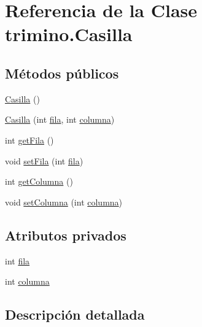 \hypertarget{classtrimino_1_1Casilla}{}\section{Referencia de la Clase trimino.\+Casilla}
\label{classtrimino_1_1Casilla}
\subsection*{Métodos públicos}
\begin{DoxyCompactItemize}
\item 
\mbox{\hyperlink{classtrimino_1_1Casilla_a80d69d5853cf1aa0e0fa5bf7fe1713b3}{Casilla}} ()
\item 
\mbox{\hyperlink{classtrimino_1_1Casilla_a0bfd77fe7a03076a4651f411dd2f8df7}{Casilla}} (int \mbox{\hyperlink{classtrimino_1_1Casilla_afedc09c20ce52a667dc80746f28b63e2}{fila}}, int \mbox{\hyperlink{classtrimino_1_1Casilla_a986c2b8494ca294496488ba7d1e7a4a1}{columna}})
\item 
int \mbox{\hyperlink{classtrimino_1_1Casilla_a97678b5862f15d06cde4072444c4a286}{get\+Fila}} ()
\item 
void \mbox{\hyperlink{classtrimino_1_1Casilla_abe0c759d79a47b35e8dc03819edf6969}{set\+Fila}} (int \mbox{\hyperlink{classtrimino_1_1Casilla_afedc09c20ce52a667dc80746f28b63e2}{fila}})
\item 
int \mbox{\hyperlink{classtrimino_1_1Casilla_a1e2d0fe750f5f525c98d96b0fd415846}{get\+Columna}} ()
\item 
void \mbox{\hyperlink{classtrimino_1_1Casilla_ab0fe6a942c41dbe145b8188b354a9de0}{set\+Columna}} (int \mbox{\hyperlink{classtrimino_1_1Casilla_a986c2b8494ca294496488ba7d1e7a4a1}{columna}})
\end{DoxyCompactItemize}
\subsection*{Atributos privados}
\begin{DoxyCompactItemize}
\item 
int \mbox{\hyperlink{classtrimino_1_1Casilla_afedc09c20ce52a667dc80746f28b63e2}{fila}}
\item 
int \mbox{\hyperlink{classtrimino_1_1Casilla_a986c2b8494ca294496488ba7d1e7a4a1}{columna}}
\end{DoxyCompactItemize}


\subsection{Descripción detallada}


